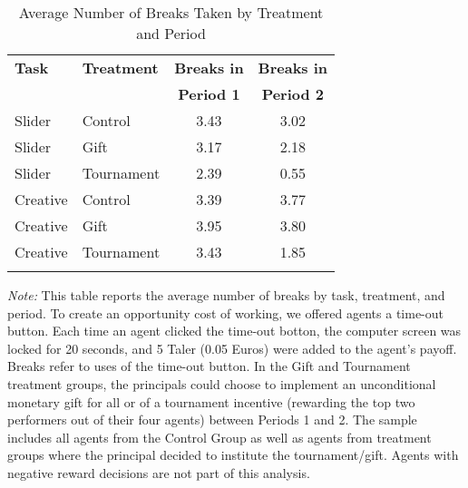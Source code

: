 \begin{table}[h]%
\setlength\tabcolsep{2pt}
\caption{Average Number of Breaks Taken by Treatment and Period}
\label{tab:BreaksMeans}
\begin{center}%
{\small\renewcommand{\arraystretch}{1}%
\begin{tabular}{llcc}
\hline\hline\noalign{\smallskip}
\bf Task & \bf Treatment & \bf Breaks in & \bf Breaks in \\
                 &                       & \bf Period 1  & \bf Period 2 \\
\hline
\noalign{\smallskip}
Slider&Control&3.43&3.02\\
Slider&Gift&3.17&2.18\\
Slider&Tournament&2.39&0.55\\
Creative&Control&3.39&3.77\\
Creative&Gift&3.95&3.80\\
Creative&Tournament&3.43&1.85\\
\hline\hline\noalign{\medskip}
\end{tabular}}
\begin{minipage}{\textwidth}
\footnotesize {\it Note:} This table reports the average number of breaks by task, treatment, and period. 
To create an opportunity cost of working, we offered agents a time-out button. Each time an agent clicked the time-out botton, the computer screen was locked for 20 seconds, and 5 Taler (0.05 Euros) were added to the agent's payoff. Breaks refer to uses of the time-out button. 
In the Gift and Tournament treatment groups, the principals could choose to implement an unconditional monetary gift for all or of a tournament incentive (rewarding the top two performers out of their four agents) between Periods 1 and 2. 
The sample includes all agents from the Control Group as well as agents from treatment groups where the principal decided to institute the tournament/gift. Agents with negative reward decisions are not part of this analysis. 
\end{minipage}
\end{center}
\end{table}
